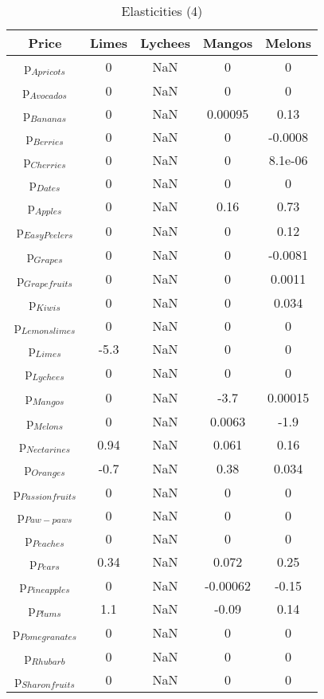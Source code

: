 \documentclass[11pt]{article}
\begin{document}
\begin{table}[h]
\caption{Elasticities (4)}
\label{Table: elasticities 4}
\begin{center}
\begin{tabular}{ccccc}
Price & Limes & Lychees & Mangos & Melons \\ \hline
p$_{Apricots}$ & 0 & NaN & 0 & 0 \\ 
p$_{Avocados}$ & 0 & NaN & 0 & 0 \\ 
p$_{Bananas}$ & 0 & NaN & 0.00095 & 0.13 \\ 
p$_{Berries}$ & 0 & NaN & 0 & -0.0008 \\ 
p$_{Cherries}$ & 0 & NaN & 0 & 8.1e-06 \\ 
p$_{Dates}$ & 0 & NaN & 0 & 0 \\ 
p$_{Apples}$ & 0 & NaN & 0.16 & 0.73 \\ 
p$_{Easy Peelers}$ & 0 & NaN & 0 & 0.12 \\ 
p$_{Grapes}$ & 0 & NaN & 0 & -0.0081 \\ 
p$_{Grapefruits}$ & 0 & NaN & 0 & 0.0011 \\ 
p$_{Kiwis}$ & 0 & NaN & 0 & 0.034 \\ 
p$_{Lemonslimes}$ & 0 & NaN & 0 & 0 \\ 
p$_{Limes}$ & -5.3 & NaN & 0 & 0 \\ 
p$_{Lychees}$ & 0 & NaN & 0 & 0 \\ 
p$_{Mangos}$ & 0 & NaN & -3.7 & 0.00015 \\ 
p$_{Melons}$ & 0 & NaN & 0.0063 & -1.9 \\ 
p$_{Nectarines}$ & 0.94 & NaN & 0.061 & 0.16 \\ 
p$_{Oranges}$ & -0.7 & NaN & 0.38 & 0.034 \\ 
p$_{Passion fruits}$ & 0 & NaN & 0 & 0 \\ 
p$_{Paw-paws}$ & 0 & NaN & 0 & 0 \\ 
p$_{Peaches}$ & 0 & NaN & 0 & 0 \\ 
p$_{Pears}$ & 0.34 & NaN & 0.072 & 0.25 \\ 
p$_{Pineapples}$ & 0 & NaN & -0.00062 & -0.15 \\ 
p$_{Plums}$ & 1.1 & NaN & -0.09 & 0.14 \\ 
p$_{Pomegranates}$ & 0 & NaN & 0 & 0 \\ 
p$_{Rhubarb}$ & 0 & NaN & 0 & 0 \\ 
p$_{Sharon fruits}$ & 0 & NaN & 0 & 0 \\ 
\end{tabular}
\end{center}
\end{table}
\end{document}
